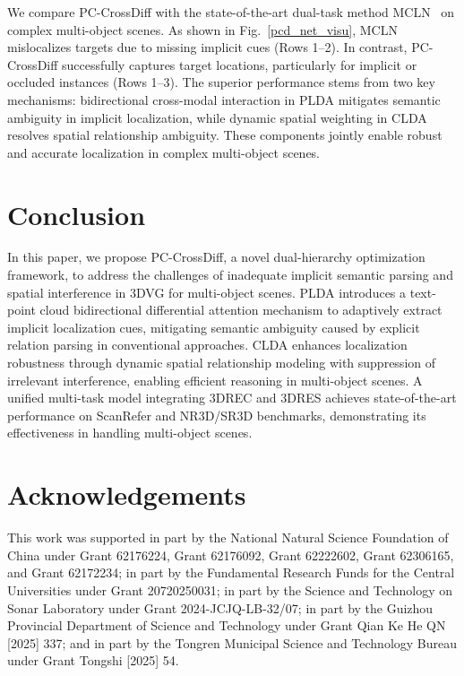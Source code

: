 \documentclass[letterpaper]{article} %
\begin{document}
We compare PC-CrossDiff with the state-of-the-art dual-task method MCLN~\cite{qianMultibranchCollaborativeLearning2024} on complex multi-object scenes. As shown in Fig.~\ref{pcd_net_visu}, MCLN mislocalizes targets due to missing implicit cues (Rows 1–2). In contrast, PC-CrossDiff successfully captures target locations, particularly for implicit or occluded instances (Rows 1–3). The superior performance stems from two key mechanisms: bidirectional cross-modal interaction in PLDA mitigates semantic ambiguity in implicit localization, while dynamic spatial weighting in CLDA resolves spatial relationship ambiguity. These components jointly enable robust and accurate localization in complex multi-object scenes.





\section{Conclusion}


In this paper, we propose PC-CrossDiff, a novel dual-hierarchy optimization framework, to address the challenges of inadequate implicit semantic parsing and spatial interference in 3DVG for multi-object scenes. PLDA introduces a text-point cloud bidirectional differential attention mechanism to adaptively extract implicit localization cues, mitigating semantic ambiguity caused by explicit relation parsing in conventional approaches. CLDA enhances localization robustness through dynamic spatial relationship modeling with suppression of irrelevant interference, enabling efficient reasoning in multi-object scenes. A unified multi-task model integrating 3DREC and 3DRES achieves state-of-the-art performance on ScanRefer and NR3D/SR3D benchmarks, demonstrating its effectiveness in handling multi-object scenes.


\section{Acknowledgements}


This work was supported in part by the National Natural Science Foundation of China under Grant 62176224, Grant 62176092, Grant 62222602, Grant 62306165, and Grant 62172234; in part by the Fundamental Research Funds for the Central Universities under Grant 20720250031; in part by the Science and Technology on Sonar Laboratory under Grant 2024-JCJQ-LB-32/07; in part by the Guizhou Provincial Department of Science and Technology under Grant Qian Ke He QN [2025] 337; and in part by the Tongren Municipal Science and Technology Bureau under Grant Tongshi [2025] 54.
\end{document}
